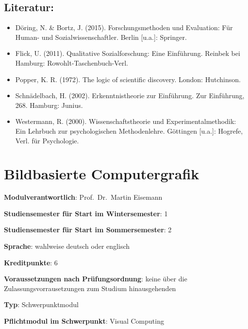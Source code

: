 \section*{Literatur:}\label{literatur-14}

\begin{itemize}
\tightlist
\item
  Döring, N. \& Bortz, J. (2015). Forschungsmethoden und Evaluation: Für
  Human- und Sozialwissenschaftler. Berlin {[}u.a.{]}: Springer.
\item
  Flick, U. (2011). Qualitative Sozialforschung: Eine Einführung.
  Reinbek bei Hamburg: Rowohlt-Taschenbuch-Verl.
\item
  Popper, K. R. (1972). The logic of scientific discovery. London:
  Hutchinson.
\item
  Schnädelbach, H. (2002). Erkenntnistheorie zur Einführung. Zur
  Einführung, 268. Hamburg: Junius.
\item
  Westermann, R. (2000). Wissenschaftstheorie und Experimentalmethodik:
  Ein Lehrbuch zur psychologischen Methodenlehre. Göttingen {[}u.a.{]}:
  Hogrefe, Verl. für Psychologie.
\end{itemize}

\chapter{Bildbasierte Computergrafik}\label{bildbasierte-computergrafik}

\begin{modulHead}
\textbf{Modulverantwortlich}: Prof.~Dr.~Martin
Eisemann
\end{modulHead}
\begin{modulHead}
\textbf{Studiensemester für
Start im Wintersemester}:
1
\end{modulHead}
\begin{modulHead}
\textbf{Studiensemester für Start
im Sommersemester}:
2
\end{modulHead}
\begin{modulHead}
\textbf{Sprache}: wahlweise deutsch
oder englisch
\end{modulHead}
\begin{modulHead}
\textbf{Kreditpunkte}:
6
\end{modulHead}
\begin{modulHead}
\textbf{Voraussetzungen nach
Prüfungsordnung}: keine über die Zulassungsvorrausetzungen zum Studium
hinausgehenden
\end{modulHead}
\begin{modulHead}
\textbf{Typ}:
Schwerpunktmodul
\end{modulHead}
\begin{modulHead}
\textbf{Pflichtmodul
im Schwerpunkt}: Visual Computing
\end{modulHead}


